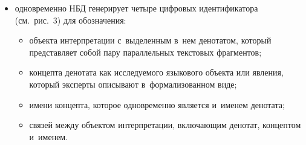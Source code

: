 {\begin{multicols}{2}
\begin{itemize}
соответствия исследуемого языкового объекта и~его ФЭФ;
\item одновременно НБД генерирует четыре цифровых идентификатора (см.\ рис.~3) 
для обозначения:
\begin{itemize}
\item объекта интерпретации с~выделенным в~нем денотатом, который 
представляет собой пару параллельных текстовых фрагментов;
\item концепта денотата как исследуемого языкового объекта или явления, 
который эксперты описывают в~формализованном виде;
\item имени концепта, которое одновременно является и~именем денотата;
\item связей между объектом интерпретации, включающим денотат, 
концептом и~именем.
\end{itemize}
\end{itemize}


\end{multicols}}

